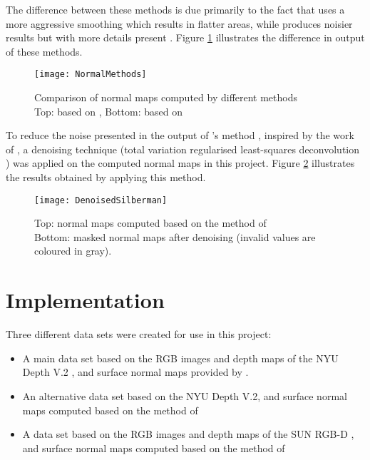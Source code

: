 The difference between these methods is due primarily to the fact that \citeauthor*{ladicky} \cite{ladicky} uses a more aggressive smoothing which results in flatter areas, while \citeauthor*{silberman} \cite{silberman} produces noisier results but with more details present \cite[p.~5]{eigen}. Figure \ref{fig:normalmethods} illustrates the difference in output of these methods.

\begin{figure}[h]
    \centering
    \texttt{[image: NormalMethods]}
    \caption{Comparison of normal maps computed by different methods \\
    Top: based on \citeauthor*{ladicky} \cite{ladicky} , Bottom: based on \citeauthor*{silberman} \cite{silberman}  }
    \label{fig:normalmethods}
\end{figure}

\pagebreak

To reduce the noise presented in the output of \citeauthor*{silberman}'s method \cite{silberman}, inspired by the work of \citeauthor*{wang}, a denoising technique (total variation regularised least-squares deconvolution \cite{chan}) was applied on the computed normal maps in this project. Figure \ref{fig:denoisedsilberman} illustrates the results obtained by applying this method.

\begin{figure}
    \centering
    \texttt{[image: DenoisedSilberman]}
    \caption{Top: normal maps computed based on the method of \citeauthor*{silberman} \cite{silberman} \\ Bottom: masked normal maps after denoising (invalid values are coloured in gray). }
    \label{fig:denoisedsilberman}
\end{figure}

\section{Implementation} \label{sec:datasets}

Three different data sets were created for use in this project: 

\begin{itemize}
    \item A main data set based on the RGB images and depth maps of the NYU Depth V.2 \cite{silberman}, and surface normal maps provided by \citeauthor*{ladicky} \cite{ladicky}.
    \item An alternative data set based on the NYU Depth V.2, and surface normal maps computed based on the method of \citeauthor*{silberman} \cite{silberman}
    \item A data set based on the RGB images and depth maps of the SUN RGB-D \cite{sun}, and surface normal maps computed based on the method of \citeauthor*{silberman} \cite{silberman}
\end{itemize}

